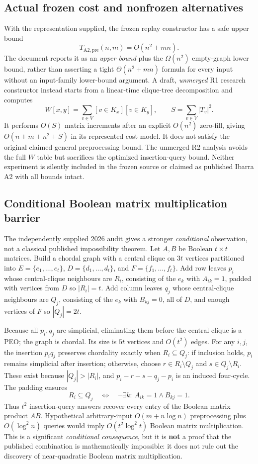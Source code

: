 \subsection{Actual frozen cost and nonfrozen alternatives}
With the representation supplied, the frozen replay constructor has a safe upper bound
\[
 T_{\mathrm{A2,pre}}(n,m)=O(n^2+mn).
\]
The document reports it as an \emph{upper bound} plus the \(\Omega(n^2)\) empty-graph lower bound, rather than asserting a tight \(\Theta(n^2+mn)\) formula for every input without an input-family lower-bound argument.  A draft, \emph{unmerged} R1 research constructor instead starts from a linear-time clique-tree decomposition and computes
\[
 W[x,y]=\sum_{v\in V}[v\in K_x][v\in K_y],\qquad
 S=\sum_{v\in V}|T_v|^2.
\]
It performs \(O(S)\) matrix increments after an explicit \(O(n^2)\) zero-fill, giving \(O(n+m+n^2+S)\) in its represented cost model.  It does not satisfy the original claimed general preprocessing bound.  The unmerged R2 analysis avoids the full \(W\) table but sacrifices the optimized insertion-query bound.  Neither experiment is silently included in the frozen source or claimed as published Ibarra A2 with all bounds intact.

\subsection{Conditional Boolean matrix multiplication barrier}
The independently supplied 2026 audit gives a stronger \emph{conditional} observation, not a classical published impossibility theorem.  Let \(A,B\) be Boolean \(t\times t\) matrices.  Build a chordal graph with a central clique on \(3t\) vertices partitioned into \(E=\{e_1,\ldots,e_t\}\), \(D=\{d_1,\ldots,d_t\}\), and \(F=\{f_1,\ldots,f_t\}\).  Add row leaves \(p_i\) whose central-clique neighbours are \(R_i\), consisting of the \(e_k\) with \(A_{ik}=1\), padded with vertices from \(D\) so \(|R_i|=t\).  Add column leaves \(q_j\) whose central-clique neighbours are \(Q_j\), consisting of the \(e_k\) with \(B_{kj}=0\), all of \(D\), and enough vertices of \(F\) so \(|Q_j|=2t\).

Because all \(p_i,q_j\) are simplicial, eliminating them before the central clique is a PEO; the graph is chordal.  Its size is \(5t\) vertices and \(O(t^2)\) edges.  For any \(i,j\), the insertion \(p_iq_j\) preserves chordality exactly when \(R_i\subseteq Q_j\): if inclusion holds, \(p_i\) remains simplicial after insertion; otherwise, choose \(r\in R_i\setminus Q_j\) and \(s\in Q_j\setminus R_i\).  These exist because \(|Q_j|>|R_i|\), and \(p_i-r-s-q_j-p_i\) is an induced four-cycle.  The padding ensures
\[
R_i\subseteq Q_j\quad\Longleftrightarrow\quad
\neg\exists k:\ A_{ik}=1\land B_{kj}=1.
\]
Thus \(t^2\) insertion-query answers recover every entry of the Boolean matrix product \(AB\).  Hypothetical arbitrary-input \(O(m+n\log n)\) preprocessing plus \(O(\log^2 n)\) queries would imply \(O(t^2\log^2t)\) Boolean matrix multiplication.  This is a significant \emph{conditional consequence}, but it is \textbf{not} a proof that the published combination is mathematically impossible: it does not rule out the discovery of near-quadratic Boolean matrix multiplication.

